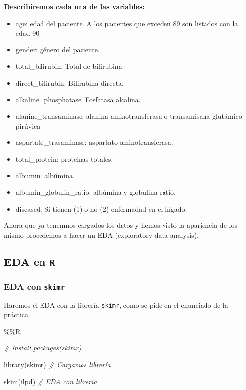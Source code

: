 \documentclass[
  11pt,
  a4paper,
]{article}
\newenvironment{Shaded}{\begin{snugshade}}{\end{snugshade}}
\newcommand{\CommentTok}[1]{\textcolor[rgb]{0.56,0.35,0.01}{\textit{#1}}}
\newcommand{\FunctionTok}[1]{\textcolor[rgb]{0.00,0.00,0.00}{#1}}
\newcommand{\NormalTok}[1]{#1}
\newcommand{\SpecialCharTok}[1]{\textcolor[rgb]{0.00,0.00,0.00}{#1}}
\providecommand{\tightlist}{%
  \setlength{\itemsep}{0pt}\setlength{\parskip}{0pt}}
\begin{document}
\vspace{1cm}

\textbf{Describiremos cada una de las variables:}

\begin{itemize}
\tightlist
\item
  age: edad del paciente. A los pacientes que exceden 89 son listados
  con la edad 90
\item
  gender: género del paciente.
\item
  total\_bilirubin: Total de bilirubina.
\item
  direct\_bilirubin: Bilirubina directa.
\item
  alkaline\_phosphatase: Fosfatasa alcalina.
\item
  alanine\_transaminase: alanina aminotransferasa o transamisana
  glutámico pirúvica.
\item
  aspartate\_trasaminase: aspartato aminotransferasa.
\item
  total\_protein: proteinas totales.
\item
  albumin: albúmina.
\item
  albumin\_globulin\_ratio: albúmina y globulina ratio.
\item
  diseased: Si tienen (1) o no (2) enfermadad en el hígado.
\end{itemize}

Ahora que ya tenenmos cargados los datos y hemos visto la apariencia de
los mismo procedemos a hacer un EDA (exploratory data analysis).

\hypertarget{eda-en-r}{%
\subsection{\texorpdfstring{EDA en \texttt{R}
}{EDA en R }}\label{eda-en-r}}

\hypertarget{eda-con-skimr}{%
\subsubsection{\texorpdfstring{EDA con \texttt{skimr}
}{EDA con skimr }}\label{eda-con-skimr}}

Haremos el EDA con la librería \texttt{skimr}, como se pide en el
enunciado de la práctica.

\begin{Shaded}
\begin{Highlighting}[]
\SpecialCharTok{\%\%}\NormalTok{R}

\CommentTok{\# install.packages(\textquotesingle{}skimr\textquotesingle{})}

\FunctionTok{library}\NormalTok{(skimr) }\CommentTok{\# Cargamos librería}

\FunctionTok{skim}\NormalTok{(ilpd) }\CommentTok{\# EDA con librería}
\end{Highlighting}
\end{Shaded}
\end{document}
